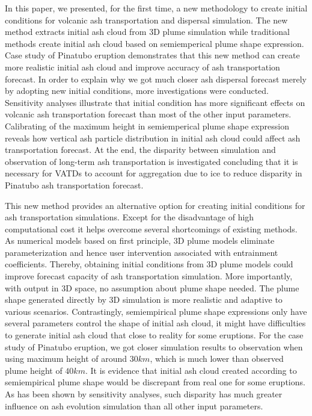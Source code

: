 In this paper, we presented, for the first time, a new methodology to create initial conditions for volcanic ash transportation and dispersal simulation. The new method extracts initial ash cloud from 3D plume simulation while traditional methods create initial ash cloud based on semiemperical plume shape expression. Case study of Pinatubo eruption demonstrates that this new method can create more realistic initial ash cloud and improve accuracy of ash transportation forecast. In order to explain why we got much closer ash dispersal forecast merely by adopting new initial conditions, more investigations were conducted. Sensitivity analyses illustrate that initial condition has more significant effects on volcanic ash transportation forecast than most of the other input parameters. Calibrating of the maximum height in semiemperical plume shape expression reveals how vertical ash particle distribution in initial ash cloud could affect ash transportation forecast. At the end, the disparity between simulation and observation of long-term ash transportation is investigated concluding that it is necessary for VATDs to account for aggregation due to ice to reduce disparity in Pinatubo ash transportation forecast.

This new method provides an alternative option for creating initial conditions for ash transportation simulations. Except for the disadvantage of high computational cost it helps overcome several shortcomings of existing methods.
As numerical models based on first principle, 3D plume models eliminate parameterization and hence user intervention associated with entrainment coefficients. Thereby, obtaining initial conditions from 3D plume models could improve forecast capacity of ash transportation simulation. More importantly, with output in 3D space, no assumption about plume shape needed. The plume shape generated directly by 3D simulation is more realistic and adaptive to various scenarios.
Contrastingly, semiempirical plume shape expressions only have several parameters control the shape of initial ash cloud, it might have difficulties to generate initial ash cloud that close to reality for some eruptions.
For the case study of Pinatubo eruption, we got closer simulation results to observation when using maximum height of around $30 km$, which is much lower than observed plume height of $40 km$. It is evidence that initial ash cloud created according to semiempirical plume shape would be discrepant from real one for some eruptions. As has been shown by sensitivity analyses, such disparity has much greater influence on ash evolution simulation than all other input parameters.

